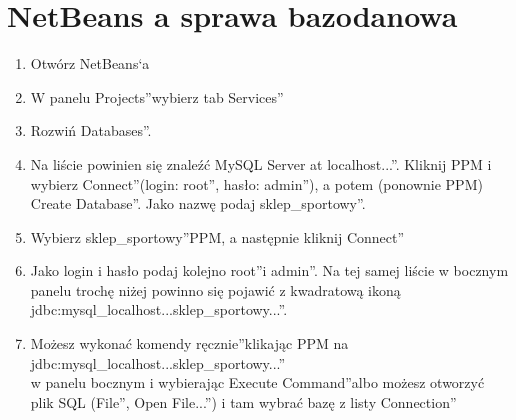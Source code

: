 \documentclass[a4paper, 11pt]{article}
\begin{document}
	\section{NetBeans a sprawa bazodanowa}
	\begin{enumerate}
		\item Otwórz NetBeans`a
		\item W panelu \quotedblbase Projects\textquotedblright wybierz tab \quotedblbase Services\textquotedblright
		\item Rozwiń \quotedblbase Databases\textquotedblright.
		\item Na liście powinien się znaleźć \quotedblbase MySQL Server at localhost...\textquotedblright. Kliknij PPM i wybierz \quotedblbase Connect\textquotedblright (login: \quotedblbase root\textquotedblright, hasło: \quotedblbase admin\textquotedblright), a potem (ponownie PPM) \quotedblbase Create Database\textquotedblright. Jako nazwę podaj \quotedblbase sklep{\_}sportowy\textquotedblright. 
		\item Wybierz \quotedblbase sklep{\_}sportowy\textquotedblright PPM, a następnie kliknij \quotedblbase Connect\textquotedblright
		\item Jako login i hasło podaj kolejno \quotedblbase root\textquotedblright i \quotedblbase admin\textquotedblright. Na tej samej liście w bocznym panelu trochę niżej powinno się pojawić z kwadratową ikoną \quotedblbase jdbc:mysql{\_}localhost...sklep{\_}sportowy...\textquotedblright.
		\item Możesz wykonać komendy \quotedblbase ręcznie\textquotedblright klikając PPM na\\
		\quotedblbase jdbc:mysql{\_}localhost...sklep{\_}sportowy...\textquotedblright\\
		 w panelu bocznym i wybierając \quotedblbase Execute Command\textquotedblright albo możesz otworzyć plik SQL (\quotedblbase File\textquotedblright, \quotedblbase Open File...\textquotedblright) i tam wybrać bazę z listy \quotedblbase Connection\textquotedblright 
	\end{enumerate}
\end{document}
